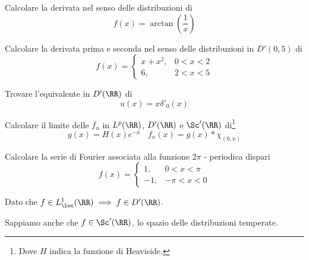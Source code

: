 \ParteEsercizi

\Esercizio{}

Calcolare la derivata nel senso delle distribuzioni di
\begin{equation*}
f(x) = \arctan\left(\frac{1}{x}\right)
\end{equation*}

\Esercizio{}

Calcolare la derivata prima e seconda nel senso delle distribuzioni in $D'(0, 5)$ di
\begin{equation*}
f(x) =
\begin{cases}
x + x^{2}, & 0 < x < 2\\
6, & 2 < x < 5
\end{cases}
\end{equation*}

\Esercizio{}

Trovare l'equivalente in $D'(\RR)$ di
\begin{equation*}
u(x) = x\delta'_{0} (x)
\end{equation*}

\Esercizio{}

Calcolare il limite delle $f_{n}$ in $L^{p} (\RR)$, $D'(\RR)$ e $\Sc'(\RR)$ di\footnote{Dove $H$ indica la funzione di Heaviside.}
\begin{equation*}
g(x) = H(x)e^{- x} \ \ \ \ f_{n} (x) = g(x)*\chi_{(0, n)}
\end{equation*}

\Esercizio{}

Calcolare la serie di Fourier associata alla funzione $2\pi $ - periodica dispari
\begin{equation*}
f(x) =
\begin{cases}
1, & 0 < x < \pi \\
- 1, & - \pi < x < 0
\end{cases}
\end{equation*}

\ParteSoluzioni

\Soluzione

Dato che $f\in L^{1}_{\loc} (\RR)\implies f\in D'(\RR)$.

Sappiamo anche che $f\in \Sc'(\RR)$, lo spazio delle distribuzioni temperate.


